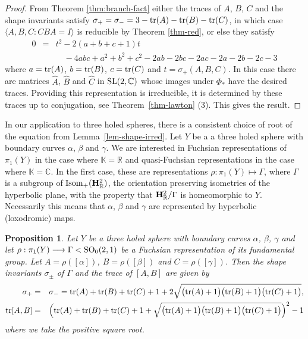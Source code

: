 \documentclass[11pt]{amsart}
\newtheorem{proposition}[theorem]{Proposition}
\numberwithin{equation}{section}
\begin{document}
\begin{proof}
From Theorem \ref{thm:branch-fact} either the traces of $A$, $B$, $C$ and the shape invariants satisfy 
$\sigma_+=\sigma_- = 3-{\rm tr}(A)-{\rm tr}(B)-{\rm tr}(C)$, in which case $\langle A,B,C:CBA=I\rangle$ is reducible by 
Theorem \ref{thm-red}, or else they satisfy 
\begin{eqnarray*}
0 & = & t^2-2(a+b+c+1)t \\
&& \quad -4abc+a^2+b^2+c^2-2ab-2bc-2ac-2a-2b-2c-3
\end{eqnarray*}
where $a={\rm tr}(A)$, $b={\rm tr}(B)$, $c={\rm tr}(C)$ and $t=\sigma_+(A,B,C)$. In this case there are
matrices $\widehat{A}$, $\widehat{B}$ and $\widehat{C}$ in ${\rm SL}(2,{\mathbb C})$ whose images 
under $\Phi_*$ have the desired traces. Providing this representation is irreducible, it is determined by these
traces up to conjugation, see Theorem~\ref{thm-lawton} (3). This gives the result.
\end{proof}

\medskip

In our application to three holed spheres, there is a consistent choice of root of the equation 
from Lemma~\ref{lem-shape-irred}. Let $Y$ be a a three holed sphere with boundary curves 
$\alpha$, $\beta$ and $\gamma$. We are interested in Fuchsian representations of $\pi_1(Y)$ in the case where
${\mathbb K}={\mathbb R}$ and quasi-Fuchsian representations in the case where ${\mathbb K}={\mathbb C}$. In the first
case, these are representations $\rho:\pi_1(Y)\longmapsto \Gamma$, where $\Gamma$ is a subgroup of 
${\rm Isom}_+({\bf H}^2_{\mathbb R})$, the orientation preserving isometries
of the hyperbolic plane, with the property that ${\bf H}^2_{\mathbb R}/\Gamma$ is homeomorphic to $Y$.
Necessarily this means that $\alpha$, $\beta$ and $\gamma$ are represented by hyperbolic (loxodromic) maps.

\begin{proposition}\label{prop-shape-fuchsian}
Let $Y$ be a three holed sphere with boundary curves $\alpha$, $\beta$, $\gamma$ and let 
$\rho:\pi_1(Y)\longrightarrow \Gamma<{\rm SO}_0(2,1)$ be a Fuchsian representation of its fundamental group. 
Let $A=\rho([\alpha])$, $B=\rho([\beta])$ and $C=\rho([\gamma])$. Then the shape invariants $\sigma_{\pm}$ of 
$\Gamma$ and the trace of $[A,B]$ are given by
\begin{eqnarray*}
\sigma_+ & = & \sigma_-={\rm tr}(A)+{\rm tr}(B)+{\rm tr}(C)+1
+2\sqrt{\bigl({\rm tr}(A)+1\bigr)\bigl({\rm tr}(B)+1\bigr)\bigl({\rm tr}(C)+1\bigr)}, \\
{\rm tr}[A,B] & = & \Bigl({\rm tr}(A)+{\rm tr}(B)+{\rm tr}(C)+1+
\sqrt{\bigl({\rm tr}(A)+1\bigr)\bigl({\rm tr}(B)+1\bigr)\bigl({\rm tr}(C)+1\bigr)}\Bigr)^2-1
\end{eqnarray*}
where we take the positive square root.
\end{proposition}
\end{document}
